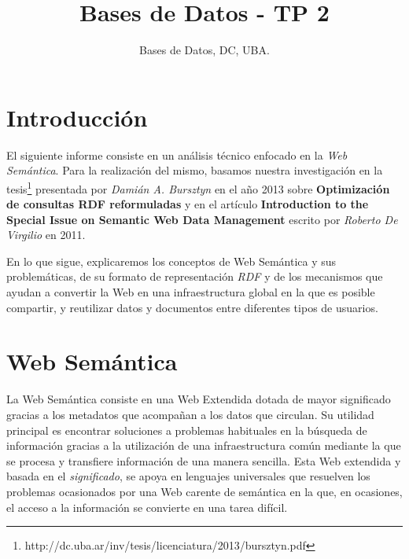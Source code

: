 \documentclass[10pt,a4paper]{article}
\title{Bases de Datos - TP 2}
\author{Bases de Datos, DC, UBA.}
\begin{document}



\maketitle

\tableofcontents

\newpage

\section{Introducción}

El siguiente informe consiste en un análisis técnico enfocado en la \textit{Web Semántica}. Para la realización del mismo, basamos nuestra investigación en la tesis\footnote{http://dc.uba.ar/inv/tesis/licenciatura/2013/bursztyn.pdf} presentada por \textit{Damián A. Bursztyn} en el año 2013 sobre \textbf{Optimización de consultas RDF reformuladas} y en el artículo \textbf{Introduction to the Special Issue on Semantic Web Data Management} escrito por \textit{Roberto De Virgilio} en 2011.

En lo que sigue, explicaremos los conceptos de Web Semántica y sus problemáticas, de su formato de representación \textit{RDF} y de los mecanismos que ayudan a convertir la Web en una infraestructura global en la que es posible compartir, y reutilizar datos y documentos entre diferentes tipos de usuarios.

\section{Web Semántica}
La Web Semántica consiste en una Web Extendida dotada de mayor significado gracias a los metadatos que acompañan a los datos que circulan. Su utilidad principal es encontrar soluciones a problemas habituales en la búsqueda de información gracias a la utilización de una infraestructura común mediante la que se procesa y transfiere información de una manera sencilla. Esta Web extendida y basada en el \textit{significado}, se apoya en lenguajes universales que resuelven los problemas ocasionados por una Web carente de semántica en la que, en ocasiones, el acceso a la información se convierte en una tarea difícil.\\
\end{document}
